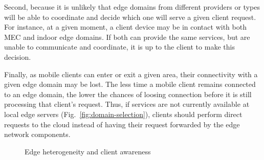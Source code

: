Second, because it is unlikely that edge domains from different providers or types will be able to coordinate and decide which one will serve a given client request. For instance, at a given moment, a client device may be in contact with both MEC and indoor edge domains. If both can provide the same services, but are unable to communicate and coordinate, it is up to the client to make this decision.





Finally, as mobile clients can enter or exit a given area, their connectivity with a given edge domain may be lost. The less time a mobile client remains connected to an edge domain, the lower the chances of loosing connection before it is still processing that client's request. Thus, if services are not currently available at local edge servers (Fig.~\ref{fig:domain-selection}), clients should perform direct requests to the cloud instead of having their request forwarded by the edge network components. 

\begin{figure}[htbp]
	\centering
	\captionsetup[subfigure]{width=0.5\textwidth}	
	\null\hfill
	\captionsetup[subfigure]{width=0.45\textwidth}	
	\hfill
	\hfill\null
	\caption{Edge heterogeneity and client awareness}\label{fig:1}
\end{figure}

